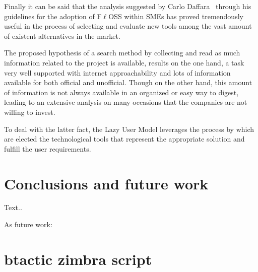 \documentclass[a4paper, 12pt]{book}
\begin{document}
\noindent Finally it can be said that the analysis suggested by Carlo Daffara~\cite{Daffara1} through his guidelines for the adoption of F$\ell$OSS within SMEs has proved tremendously useful in the process of selecting and evaluate new tools among the vast amount of existent alternatives in the market.\bigskip

\noindent The proposed hypothesis of a search method by collecting and read as much information related to the project is available, results on the one hand, a task very well supported with internet approachability and lots of information available for both official and unofficial. Though on the other hand, this amount of information is not always available in an organized or easy way to digest, leading to an extensive analysis on many occasions that the companies are not willing to invest.\bigskip

\noindent To deal with the latter fact, the Lazy User Model leverages the process by which are elected the technological tools that represent the appropriate solution and fulfill the user requirements. 



%
\chapter{Conclusions and future work}
\label{chap:conclusions}

Text..

As future work:






%
{}



%
\appendix
\chapter{btactic zimbra script}
\label{app:appendix1}
\end{document}
